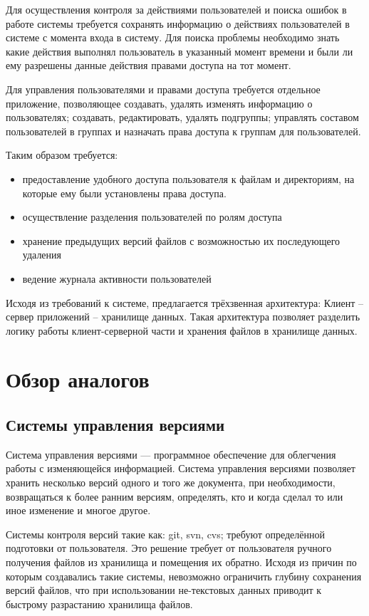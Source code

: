 \documentclass[utf8,usehyperref,12pt]{G7-32}
\begin{document}
Для осуществления контроля за действиями пользователей и поиска ошибок в работе системы требуется сохранять информацию о действиях пользователей в системе с момента входа в систему. Для поиска проблемы необходимо знать какие действия выполнял пользователь в указанный момент времени и были ли ему разрешены данные действия правами доступа на тот момент.

Для управления пользователями и правами доступа требуется отдельное приложение, позволяющее создавать, удалять изменять информацию о пользователях; создавать, редактировать, удалять подгруппы; управлять составом пользователей в группах и назначать права доступа к группам для пользователей.

Таким образом требуется:
\begin{itemize}
\item предоставление удобного доступа пользователя к файлам и директориям, на которые ему были установлены права доступа.
\item осуществление разделения пользователей по ролям доступа
\item хранение предыдущих версий файлов с возможностью их последующего удаления
\item ведение журнала активности пользователей
\end{itemize}

Исходя из требований к системе, предлагается трёхзвенная архитектура: Клиент -- сервер приложений -- хранилище данных. Такая архитектура позволяет разделить логику работы клиент-серверной части и хранения файлов в хранилище данных. 

\section{Обзор аналогов}\label{sect_analogs}
\subsection{Системы управления версиями}
Система управления версиями — программное обеспечение для облегчения работы с изменяющейся информацией. Система управления версиями позволяет хранить несколько версий одного и того же документа, при необходимости, возвращаться к более ранним версиям, определять, кто и когда сделал то или иное изменение и многое другое.

Системы контроля версий такие как: git, svn, cvs; требуют определённой подготовки от пользователя. Это решение требует от пользователя ручного получения файлов из хранилища и помещения их обратно. Исходя из причин по которым создавались такие системы, невозможно ограничить глубину сохранения версий файлов, что при использовании не-текстовых данных приводит к быстрому разрастанию хранилища файлов.
\end{document}
